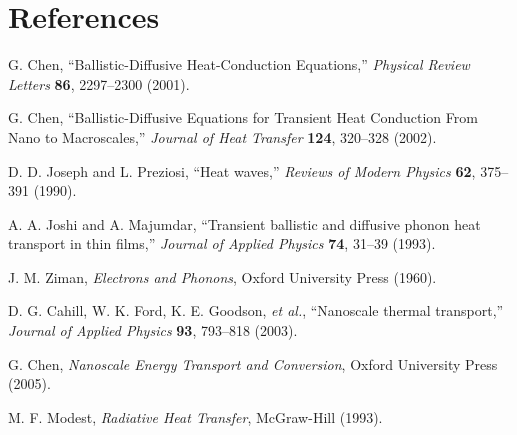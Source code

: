 \documentclass[11pt]{article}
\begin{document}
\section{References}
\begin{sloppypar}
\begin{enumerate}[label={[\arabic*]}]
\item G. Chen, ``Ballistic-Diffusive Heat-Conduction Equations,'' \emph{Physical Review Letters} \textbf{86}, 2297--2300 (2001).
\item G. Chen, ``Ballistic-Diffusive Equations for Transient Heat Conduction From Nano to Macroscales,'' \emph{Journal of Heat Transfer} \textbf{124}, 320--328 (2002).
\item D. D. Joseph and L. Preziosi, ``Heat waves,'' \emph{Reviews of Modern Physics} \textbf{62}, 375--391 (1990).
\item A. A. Joshi and A. Majumdar, ``Transient ballistic and diffusive phonon heat transport in thin films,'' \emph{Journal of Applied Physics} \textbf{74}, 31--39 (1993).
\item J. M. Ziman, \emph{Electrons and Phonons}, Oxford University Press (1960).
\item D. G. Cahill, W. K. Ford, K. E. Goodson, \emph{et al.}, ``Nanoscale thermal transport,'' \emph{Journal of Applied Physics} \textbf{93}, 793--818 (2003).
\item G. Chen, \emph{Nanoscale Energy Transport and Conversion}, Oxford University Press (2005).
\item M. F. Modest, \emph{Radiative Heat Transfer}, McGraw-Hill (1993).
\end{enumerate}
\end{sloppypar}
\end{document}

